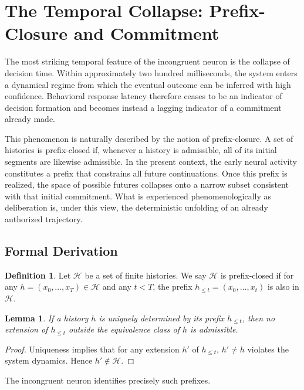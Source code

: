 \documentclass[11pt]{article}
\theoremstyle{plain}
\newtheorem{lemma}{Lemma}
\theoremstyle{definition}
\newtheorem{definition}{Definition}
\begin{document}
\section{The Temporal Collapse: Prefix-Closure and Commitment}

The most striking temporal feature of the incongruent neuron is the collapse of decision time. Within approximately two hundred milliseconds, the system enters a dynamical regime from which the eventual outcome can be inferred with high confidence. Behavioral response latency therefore ceases to be an indicator of decision formation and becomes instead a lagging indicator of a commitment already made.

This phenomenon is naturally described by the notion of prefix-closure. A set of histories is prefix-closed if, whenever a history is admissible, all of its initial segments are likewise admissible. In the present context, the early neural activity constitutes a prefix that constrains all future continuations. Once this prefix is realized, the space of possible futures collapses onto a narrow subset consistent with that initial commitment. What is experienced phenomenologically as deliberation is, under this view, the deterministic unfolding of an already authorized trajectory.

\subsection*{Formal Derivation}

\begin{definition}
Let $\mathcal{H}$ be a set of finite histories. We say $\mathcal{H}$ is prefix-closed if for any $h = (x_0,\dots,x_T)\in\mathcal{H}$ and any $t<T$, the prefix $h_{\le t}=(x_0,\dots,x_t)$ is also in $\mathcal{H}$.
\end{definition}

\begin{lemma}
If a history $h$ is uniquely determined by its prefix $h_{\le t}$, then no extension of $h_{\le t}$ outside the equivalence class of $h$ is admissible.
\end{lemma}

\begin{proof}
Uniqueness implies that for any extension $h'$ of $h_{\le t}$, $h' \neq h$ violates the system dynamics. Hence $h'\notin\mathcal{H}$.
\end{proof}

The incongruent neuron identifies precisely such prefixes.
\end{document}
